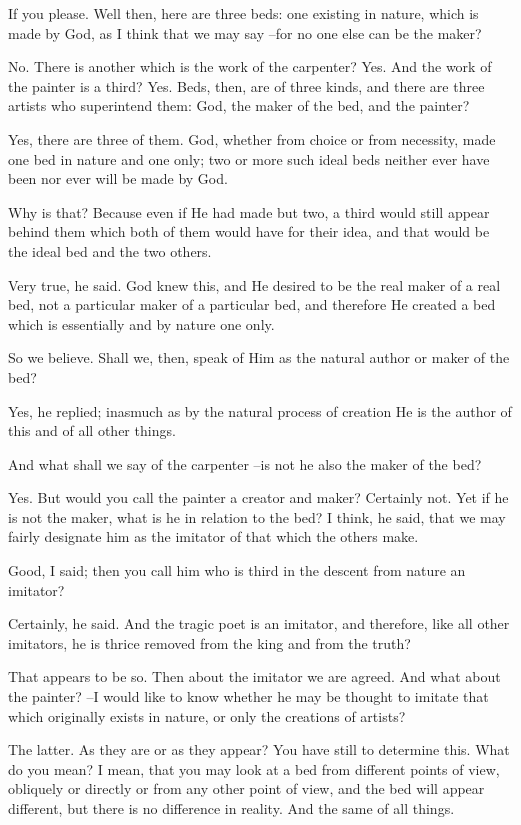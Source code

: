If you please.
Well then, here are three beds: one existing in nature, which is made by God, as I think that we may say --for no one else can be the maker?

No.
There is another which is the work of the carpenter?
Yes.
And the work of the painter is a third?
Yes.
Beds, then, are of three kinds, and there are three artists who superintend them: God, the maker of the bed, and the painter?

Yes, there are three of them.
God, whether from choice or from necessity, made one bed in nature and one only; two or more such ideal beds neither ever have been nor ever will be made by God.

Why is that?
Because even if He had made but two, a third would still appear behind them which both of them would have for their idea, and that would be the ideal bed and the two others.

Very true, he said.
God knew this, and He desired to be the real maker of a real bed, not a particular maker of a particular bed, and therefore He created a bed which is essentially and by nature one only.

So we believe.
Shall we, then, speak of Him as the natural author or maker of the bed?

Yes, he replied; inasmuch as by the natural process of creation He is the author of this and of all other things.

And what shall we say of the carpenter --is not he also the maker of the bed?

Yes.
But would you call the painter a creator and maker?
Certainly not.
Yet if he is not the maker, what is he in relation to the bed?
I think, he said, that we may fairly designate him as the imitator of that which the others make.

Good, I said; then you call him who is third in the descent from nature an imitator?

Certainly, he said.
And the tragic poet is an imitator, and therefore, like all other imitators, he is thrice removed from the king and from the truth?

That appears to be so.
Then about the imitator we are agreed. And what about the painter? --I would like to know whether he may be thought to imitate that which originally exists in nature, or only the creations of artists?

The latter.
As they are or as they appear? You have still to determine this.
What do you mean?
I mean, that you may look at a bed from different points of view, obliquely or directly or from any other point of view, and the bed will appear different, but there is no difference in reality. And the same of all things.

